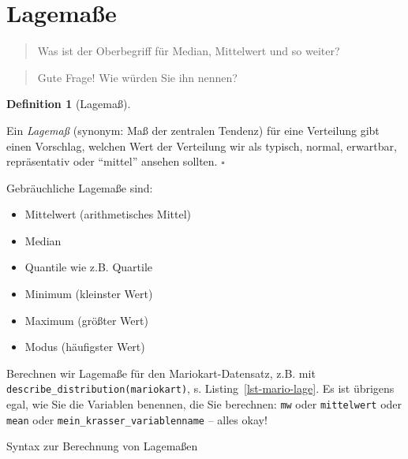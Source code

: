 \documentclass[
  letterpaper,
  twoside,
  open=any]{scrbook}
\newenvironment{Shaded}{\begin{snugshade}}{\end{snugshade}}
\newcommand{\CommentTok}[1]{\textcolor[rgb]{0.37,0.37,0.37}{#1}}
\newcommand{\FunctionTok}[1]{\textcolor[rgb]{0.28,0.35,0.67}{#1}}
\newcommand{\NormalTok}[1]{\textcolor[rgb]{0.00,0.23,0.31}{#1}}
\newcommand{\SpecialCharTok}[1]{\textcolor[rgb]{0.37,0.37,0.37}{#1}}
\providecommand{\tightlist}{%
  \setlength{\itemsep}{0pt}\setlength{\parskip}{0pt}}\usepackage{longtable,booktabs,array}
\theoremstyle{definition}
\newtheorem{definition}{Definition}[chapter]
\theoremstyle{definition}
\theoremstyle{definition}
\theoremstyle{remark}
\begin{document}
\section{Lagemaße}\label{sec-lage}

\begin{quote}
{} Was ist der Oberbegriff für Median, Mittelwert und so
weiter?
\end{quote}

\begin{quote}
{} Gute Frage! Wie würden Sie ihn nennen?
\end{quote}

\begin{definition}[Lagemaß]\protect\hypertarget{def-lage}{}\label{def-lage}

Ein \emph{Lagemaß} (synonym: Maß der zentralen Tendenz) für eine
Verteilung gibt einen Vorschlag, welchen Wert der Verteilung wir als
typisch, normal, erwartbar, repräsentativ oder \enquote{mittel} ansehen
sollten. \(\square\)

\end{definition}

Gebräuchliche Lagemaße sind:

\begin{itemize}
\tightlist
\item
  Mittelwert (arithmetisches Mittel)
\item
  Median
\item
  Quantile wie z.B. Quartile
\item
  Minimum (kleinster Wert)
\item
  Maximum (größter Wert)
\item
  Modus (häufigster Wert)
\end{itemize}

Berechnen wir Lagemaße für den Mariokart-Datensatz, z.B. mit
\texttt{describe\_distribution(mariokart)}, s.
Listing~\ref{lst-mario-lage}. Es ist übrigens egal, wie Sie die
Variablen benennen, die Sie berechnen: \texttt{mw} oder
\texttt{mittelwert} oder \texttt{mean} oder
\texttt{mein\_krasser\_variablenname} -- alles okay!

\begin{codelisting}

\caption{\label{lst-mario-lage}Syntax zur Berechnung von Lagemaßen}

\centering{

\begin{Shaded}
\begin{Highlighting}[]
\FunctionTok{describe\_distribution}\NormalTok{(mariokart) }\SpecialCharTok{|\textgreater{}}  
  \CommentTok{\# Einige Spalten interessieren uns hier nicht:}
  \FunctionTok{select}\NormalTok{(}\SpecialCharTok{{-}}\NormalTok{Skewness, }\SpecialCharTok{{-}}\NormalTok{Kurtosis, }\SpecialCharTok{{-}}\NormalTok{n, n\_Missing)}
\end{Highlighting}
\end{Shaded}

}

\end{codelisting}%
\end{document}
